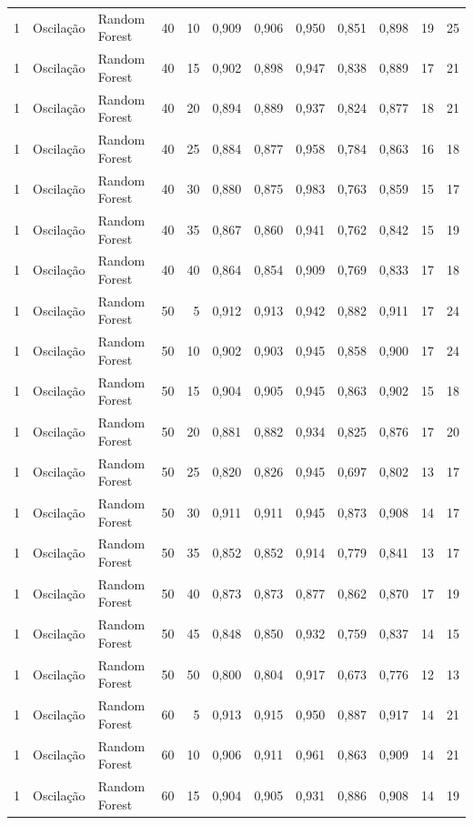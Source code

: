 \begin{longtable}{@{}rllrrrrrrrrr@{}}
1 & Oscilação & Random Forest & 40 & 10 & 0,909 & 0,906 & 0,950 & 0,851 & 0,898 & 19 & 25 \\
1 & Oscilação & Random Forest & 40 & 15 & 0,902 & 0,898 & 0,947 & 0,838 & 0,889 & 17 & 21 \\
1 & Oscilação & Random Forest & 40 & 20 & 0,894 & 0,889 & 0,937 & 0,824 & 0,877 & 18 & 21 \\
1 & Oscilação & Random Forest & 40 & 25 & 0,884 & 0,877 & 0,958 & 0,784 & 0,863 & 16 & 18 \\
1 & Oscilação & Random Forest & 40 & 30 & 0,880 & 0,875 & 0,983 & 0,763 & 0,859 & 15 & 17 \\
1 & Oscilação & Random Forest & 40 & 35 & 0,867 & 0,860 & 0,941 & 0,762 & 0,842 & 15 & 19 \\
1 & Oscilação & Random Forest & 40 & 40 & 0,864 & 0,854 & 0,909 & 0,769 & 0,833 & 17 & 18 \\
1 & Oscilação & Random Forest & 50 & 5 & 0,912 & 0,913 & 0,942 & 0,882 & 0,911 & 17 & 24 \\
1 & Oscilação & Random Forest & 50 & 10 & 0,902 & 0,903 & 0,945 & 0,858 & 0,900 & 17 & 24 \\
1 & Oscilação & Random Forest & 50 & 15 & 0,904 & 0,905 & 0,945 & 0,863 & 0,902 & 15 & 18 \\
1 & Oscilação & Random Forest & 50 & 20 & 0,881 & 0,882 & 0,934 & 0,825 & 0,876 & 17 & 20 \\
1 & Oscilação & Random Forest & 50 & 25 & 0,820 & 0,826 & 0,945 & 0,697 & 0,802 & 13 & 17 \\
1 & Oscilação & Random Forest & 50 & 30 & 0,911 & 0,911 & 0,945 & 0,873 & 0,908 & 14 & 17 \\
1 & Oscilação & Random Forest & 50 & 35 & 0,852 & 0,852 & 0,914 & 0,779 & 0,841 & 13 & 17 \\
1 & Oscilação & Random Forest & 50 & 40 & 0,873 & 0,873 & 0,877 & 0,862 & 0,870 & 17 & 19 \\
1 & Oscilação & Random Forest & 50 & 45 & 0,848 & 0,850 & 0,932 & 0,759 & 0,837 & 14 & 15 \\
1 & Oscilação & Random Forest & 50 & 50 & 0,800 & 0,804 & 0,917 & 0,673 & 0,776 & 12 & 13 \\
1 & Oscilação & Random Forest & 60 & 5 & 0,913 & 0,915 & 0,950 & 0,887 & 0,917 & 14 & 21 \\
1 & Oscilação & Random Forest & 60 & 10 & 0,906 & 0,911 & 0,961 & 0,863 & 0,909 & 14 & 21 \\
1 & Oscilação & Random Forest & 60 & 15 & 0,904 & 0,905 & 0,931 & 0,886 & 0,908 & 14 & 19 \\

\end{longtable}
